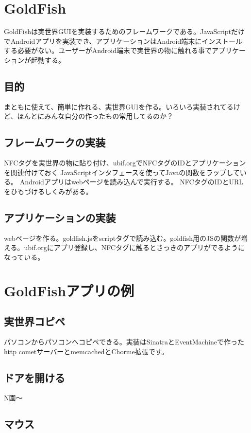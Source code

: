\section{GoldFish}
GoldFishは実世界GUIを実装するためのフレームワークである。JavaScriptだけでAndroidアプリを実装でき、アプリケーションはAndroid端末にインストールする必要がない。ユーザーがAndroid端末で実世界の物に触れる事でアプリケーションが起動する。

\subsection{目的}
まともに使えて、簡単に作れる、実世界GUIを作る。いろいろ実装されてるけど、ほんとにみんな自分の作ったもの常用してるのか？

\subsection{フレームワークの実装}
NFCタグを実世界の物に貼り付け、ubif.orgでNFCタグのIDとアプリケーションを関連付けておく
JavaScriptインタフェースを使ってJavaの関数をラップしている。
Androidアプリはwebページを読み込んで実行する。
NFCタグのIDとURLをひもづけるしくみがある。
\subsection{アプリケーションの実装}
webページを作る。goldfish.jsをscriptタグで読み込む。goldfish用のJSの関数が増える。ubif.orgにアプリ登録し、NFCタグに触るとさっきのアプリがでるようになっている。


\section{GoldFishアプリの例}
\subsection{実世界コピペ}
パソコンからパソコンへコピペできる。実装はSinatraとEventMachineで作ったhttp cometサーバーとmemcachedとChorme拡張です。

\subsection{ドアを開ける}
N園〜

\subsection{マウス}

